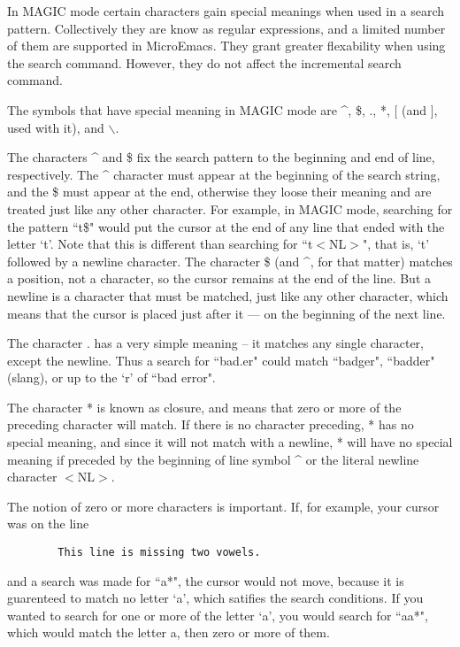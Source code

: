      In MAGIC mode certain characters gain special meanings when
used in a search pattern.  Collectively they are know as regular
expressions, and a limited number of them are supported in MicroEmacs.
They grant greater flexability when using the search command.  However,
they do not affect the incremental search command.

     The symbols that have special meaning in MAGIC mode are
\^{}, \$, ., *, [ (and ], used with it), and $\backslash${}.

     The characters \^{} and \$ fix the search pattern to the
beginning and end of line, respectively.  The \^{} character must
appear at the beginning of the search string, and the \$ must appear
at the end, otherwise they loose their meaning and are treated just
like any other character.  For example, in MAGIC mode, searching for
the pattern ``t\$" would put the cursor at the end of any line that
ended with the letter `t'.  Note that this is different than searching
for ``t$<${}NL$>${}", that is, `t' followed by a newline character.
The character \$ (and \^{}, for that matter) matches a position, not a
character, so the cursor remains at the end of the line.  But a
newline is a character that must be matched, just like any other
character, which means that the cursor is placed just after it --- on
the beginning of the next line.

     The character .  has a very simple meaning -- it matches any single
character, except the newline.  Thus a search for ``bad.er" could match
``badger", ``badder" (slang), or up to the `r' of ``bad error".

     The character * is known as closure, and means that zero or more of
the preceding character will match.  If there is no character preceding,
* has no special meaning, and since it will not match with a newline, *
will have no special meaning if preceded by the beginning of line symbol
\^{} or the literal newline character $<${}NL$>${}.

     The notion of zero or more characters is important.  If, for
example, your cursor was on the line

\begin{verbatim}
        This line is missing two vowels.
\end{verbatim}

and a search was made for ``a*", the cursor would not move, because it is
guarenteed to match no letter `a', which satifies the search
conditions.  If you wanted to search for one or more of the letter `a',
you would search for ``aa*", which would match the letter a, then zero or
more of them.

